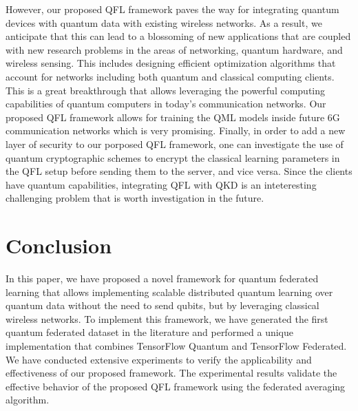 \documentclass{article}
\begin{document}
However, our proposed QFL framework paves the way for integrating quantum devices with quantum data with existing wireless networks. As a result, we anticipate that this can lead to a blossoming of new applications that are coupled with new research problems in the areas of networking, quantum hardware, and wireless sensing. This includes designing efficient optimization algorithms that account for networks including both quantum and classical computing clients. This is a great breakthrough that allows leveraging the powerful computing capabilities of quantum computers in today's communication networks. Our proposed QFL framework allows for training the QML models inside future 6G communication networks which is very promising. Finally, in order to add a new layer of security to our porposed QFL framework, one can investigate the use of quantum cryptographic schemes to encrypt the classical learning parameters in the QFL setup before sending them to the server, and vice versa. Since the clients have quantum capabilities, integrating QFL with QKD is an inteteresting challenging problem that is worth investigation in the future.


\section{Conclusion}
\label{conclusion}
In this paper, we have proposed a novel framework for quantum federated learning that allows implementing scalable distributed quantum learning over quantum data without the need to send qubits, but by leveraging classical wireless networks. To implement this framework, we have generated the first quantum federated dataset in the literature and performed a unique implementation that combines TensorFlow Quantum and TensorFlow Federated. We have conducted extensive experiments to verify the applicability and effectiveness of our proposed framework. The experimental results validate the effective behavior of the proposed QFL framework using the federated averaging algorithm.







\end{document}
